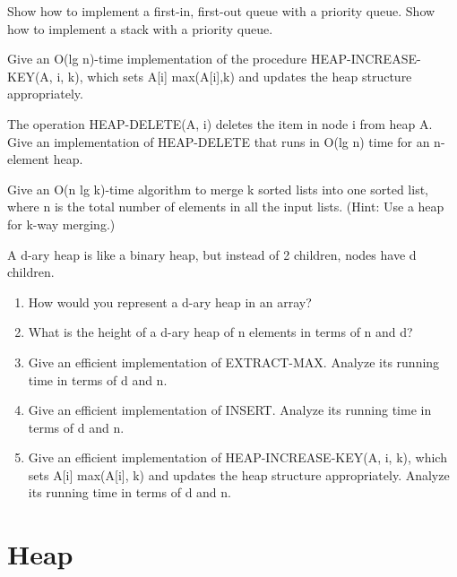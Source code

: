 \begin{problem}
Show how to implement a first-in, first-out queue with a priority queue. Show how to implement a stack with a priority queue.
\end{problem}


\begin{problem}

Give an O(lg n)-time implementation of the procedure HEAP-INCREASE-KEY(A, i, k), which sets A[i]  max(A[i],k) and updates the heap structure appropriately.
\end{problem}

\begin{problem}

The operation HEAP-DELETE(A, i) deletes the item in node i from heap A. Give an implementation of HEAP-DELETE that runs in O(lg n) time for an n-element heap.
\end{problem}

\begin{problem}

Give an O(n lg k)-time algorithm to merge k sorted lists into one sorted list, where n is the total number of elements in all the input lists. (Hint: Use a heap for k-way merging.)
\end{problem}


\begin{problem}

A d-ary heap is like a binary heap, but instead of 2 children, nodes have d children.
\begin{enumerate}
\item How would you represent a d-ary heap in an array?
\item What is the height of a d-ary heap of n elements in terms of n and d?
\item Give an efficient implementation of EXTRACT-MAX. Analyze its running time in terms of d and n.
\item Give an efficient implementation of INSERT. Analyze its running time in terms of d and n.
\item Give an efficient implementation of HEAP-INCREASE-KEY(A, i, k), which sets A[i]  max(A[i], k) and updates the heap structure appropriately. Analyze its running time in terms of d and n.
\end{enumerate}
\end{problem}








\chapter{Heap}




